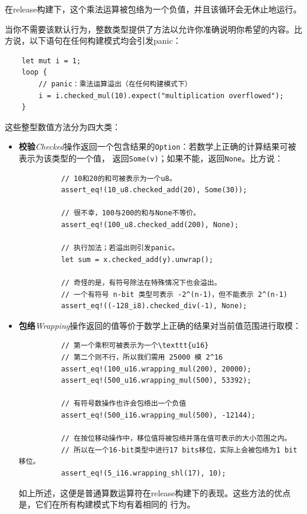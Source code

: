 \smallskip
在release构建下，这个乘法运算被包络为一个负值，并且该循环会无休止地运行。

\medskip
当你不需要该默认行为，整数类型提供了方法以允许你准确说明你希望的内容。比方说，以下语句在任何构建模式均会引发panic：
\begin{verbatim}
    let mut i = 1;
    loop {
        // panic：乘法运算溢出（在任何构建模式下）
        i = i.checked_mul(10).expect("multiplication overflowed");
    }
\end{verbatim}

\smallskip
这些整型数值方法分为四大类：

\begin{itemize}
    \item \textbf{校验}\textit{Checked}操作返回一个包含结果的\texttt{Option}：若数学上正确的计算结果可被表示为该类型的一个值，
          返回\texttt{Some(v)}；如果不能，返回\texttt{None}。比方说：
          \begin{verbatim}
          // 10和20的和可被表示为一个u8。
          assert_eq!(10_u8.checked_add(20), Some(30));

          // 很不幸，100与200的和与None不等价。
          assert_eq!(100_u8.checked_add(200), None);

          // 执行加法；若溢出则引发panic。
          let sum = x.checked_add(y).unwrap();

          // 奇怪的是，有符号除法在特殊情况下也会溢出。
          // 一个有符号 n-bit 类型可表示 -2^(n-1)，但不能表示 2^(n-1)
          assert_eq!((-128_i8).checked_div(-1), None);
          \end{verbatim}
    \item \textbf{包络}\textit{Wrapping}操作返回的值等价于数学上正确的结果对当前值范围进行取模：
          \begin{verbatim}
          // 第一个乘积可被表示为一个\texttt{u16}
          // 第二个则不行，所以我们需用 25000 模 2^16
          assert_eq!(100_u16.wrapping_mul(200), 20000);
          assert_eq!(500_u16.wrapping_mul(500), 53392);

          // 有符号数操作也许会包络出一个负值
          assert_eq!(500_i16.wrapping_mul(500), -12144);

          // 在按位移动操作中，移位值将被包络并落在值可表示的大小范围之内。
          // 所以在一个16-bit类型中进行17 bits移位，实际上会被包络为1 bit移位。
          assert_eq!(5_i16.wrapping_shl(17), 10);
          \end{verbatim}

          \smallskip
          如上所述，这便是普通算数运算符在release构建下的表现。这些方法的优点是，它们在所有构建模式下均有着相同的
          行为。


\end{itemize}
